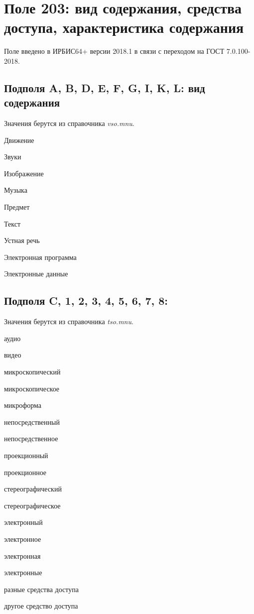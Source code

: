 \chapter{Поле 203: вид содержания, средства доступа, характеристика содержания}

Поле введено в ИРБИС64+ версии 2018.1 в связи с переходом на ГОСТ 7.0.100-2018.

\section{Подполя A, B, D, E, F, G, I, K, L: вид содержания}

Значения берутся из справочника \emph{vso.mnu}.

\begin{cutelist}
    \item Движение
    \item Звуки
    \item Изображение
    \item Музыка
    \item Предмет
    \item Текст
    \item Устная речь
    \item Электронная программа
    \item Электронные данные
\end{cutelist}

\section{Подполя C, 1, 2, 3, 4, 5, 6, 7, 8: }

Значения берутся из справочника \emph{tso.mnu}.

\begin{cutelist}
    \item аудио
    \item видео
    \item микроскопический
    \item микроскопическое
    \item микроформа
    \item непосредственный
    \item непосредственное
    \item проекционный
    \item проекционное
    \item стереографический
    \item стереографическое
    \item электронный
    \item электронное
    \item электронная
    \item электронные
    \item разные средства доступа
    \item другое средство доступа
\end{cutelist}

